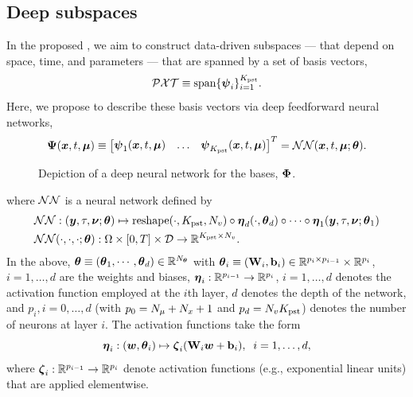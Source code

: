 \documentclass[3p,computermodern,10pt]{elsarticle}
\begin{document}
\subsection{Deep subspaces}
In the proposed \MLSubspaceNameLowercase, we aim to construct data-driven subspaces --- that depend on space, time, and parameters --- that are spanned by a set of basis vectors, 
$$\mathcal{PXT} \equiv \text{span}\{\boldsymbol \psi_i\}_{i=1}^{K_{\text{pst}}}.$$
Here, we propose to describe these basis vectors via deep feedforward neural networks,
$$\boldsymbol \Psi (\boldsymbol x, t,\boldsymbol \mu)\equiv \begin{bmatrix} \boldsymbol \psi_1(\boldsymbol x, t,\boldsymbol \mu) &
\hdots & 
 \boldsymbol \psi_{K_{\text{pst}}}(\boldsymbol x, t,\boldsymbol \mu) \end{bmatrix}^T
= \mathcal{NN}(\boldsymbol x, t,\boldsymbol \mu;\boldsymbol \theta).
$$
\begin{figure}
\begin{center}

\caption{Depiction of a deep neural network for the bases, $\boldsymbol \Phi$.}
\end{center}
\end{figure}
where $\mathcal{NN}$ is a neural network defined by
\begin{align}
&\mathcal{NN} : (\boldsymbol y,\tau,\boldsymbol \nu;\boldsymbol \theta) \mapsto \text{reshape}(\cdot,K_{\text{pst}} ,N_v) \circ \boldsymbol \eta_d(\cdot,\boldsymbol \theta_d) \circ \cdots \circ \boldsymbol \eta_1(\boldsymbol y,\tau,\boldsymbol \nu; \boldsymbol \theta_1) \\
&\mathcal{NN}(\cdot,\cdot,\cdot;\boldsymbol \theta) : \Omega \times [0,T] \times \mathcal{D} \rightarrow \mathbb{R}^{K_{\text{pst}} \times N_v}.
\end{align}
In the above, $\boldsymbol \theta \equiv (\boldsymbol \theta_1,\cdots,\boldsymbol \theta_d) \in \mathbb{R}^{N_{\boldsymbol \theta}}$ with $\boldsymbol \theta_i \equiv (\mathbf{W}_i,\mathbf{b}_i) \in \mathbb{R}^{p_i \times p_{i-1}} \times \mathbb{R}^{p_i}$, $i=1,\ldots,d$ are the weights and biases, $\boldsymbol \eta_i : \mathbb{R}^{p_{i-1}} \rightarrow \mathbb{R}^{p_i}$, $i=1,\ldots,d$ denotes the activation function employed at the $i$th layer, $d$ denotes the depth of the network, and $p_i, i=0,\ldots,d$ (with $p_0 = N_{\mu} + N_x + 1$ and $p_d = N_v K_{\text{pst}}$) denotes the number of neurons at layer $i$. The activation functions take the form
$$\boldsymbol \eta_i: (\boldsymbol w, \boldsymbol \theta_i) \mapsto \boldsymbol \zeta_i(\mathbf{W}_i \boldsymbol w + \mathbf{b}_i), \; \; i=1,\ldots,d,$$
where $\boldsymbol \zeta_i : \mathbb{R}^{p_{i-1}} \rightarrow \mathbb{R}^{p_i}$ denote activation functions (e.g., exponential linear units) that are applied elementwise.  
\end{document}
